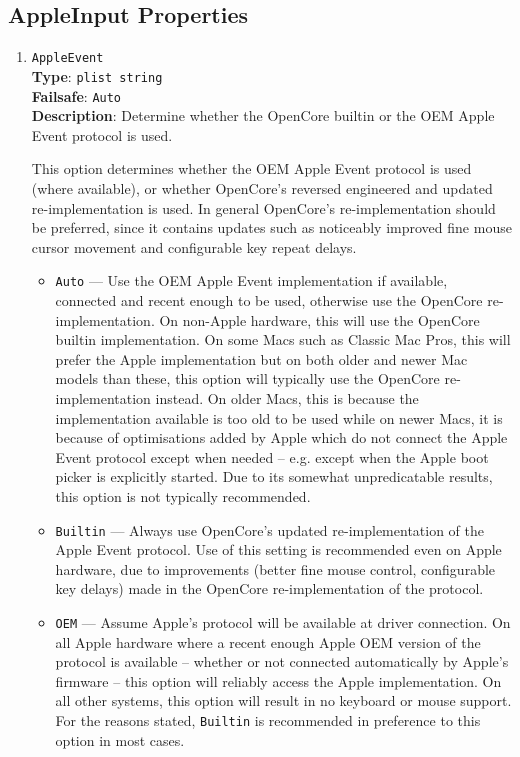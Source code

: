 \documentclass[]{article}
\providecommand{\tightlist}{%
  \setlength{\itemsep}{0pt}\setlength{\parskip}{0pt}}
\begin{document}
\begin{enumerate}
\end{enumerate}

\subsection{AppleInput Properties}\label{uefiappleinputprops}

\begin{enumerate}

  \item
  \texttt{AppleEvent}\\
  \textbf{Type}: \texttt{plist\ string}\\
  \textbf{Failsafe}: \texttt{Auto}\\
  \textbf{Description}: Determine whether the OpenCore builtin or the OEM Apple Event protocol is used.

  This option determines whether the OEM Apple Event protocol is used (where available), or
  whether OpenCore's reversed engineered and updated re-implementation is used. In general
  OpenCore's re-implementation should be preferred, since it contains updates such as noticeably
  improved fine mouse cursor movement and configurable key repeat delays.

  \begin{itemize}
  \tightlist
  \item \texttt{Auto} --- Use the OEM Apple Event implementation if available, connected and
  recent enough to be used, otherwise use the OpenCore re-implementation.
  On non-Apple hardware, this will use the OpenCore builtin implementation.
  On some Macs such as Classic Mac Pros, this will prefer the Apple implementation but on both older and
  newer Mac models than these, this option will typically use the OpenCore re-implementation instead.
  On older Macs, this is because the implementation available is too old to be used while on newer Macs,
  it is because of optimisations added by Apple which do not connect the Apple Event protocol
  except when needed -- e.g. except when the Apple boot picker is explicitly started.
  Due to its somewhat unpredicatable results, this option is not typically recommended.
  \item \texttt{Builtin} ---  Always use OpenCore's updated re-implementation of the Apple Event protocol.
  Use of this setting is recommended even on Apple hardware, due to
  improvements (better fine mouse control, configurable key delays) made in the OpenCore re-implementation
  of the protocol.
  \item \texttt{OEM} --- Assume Apple's protocol will be available at driver connection. On all Apple hardware
  where a recent enough Apple OEM version of the protocol is available -- whether or not connected automatically
  by Apple's firmware -- this option will reliably access the Apple implementation. On all other systems, this
  option will result in no keyboard or mouse support. For the reasons stated, \texttt{Builtin} is recommended in
  preference to this option in most cases.
  \end{itemize}


\end{enumerate}
\end{document}
